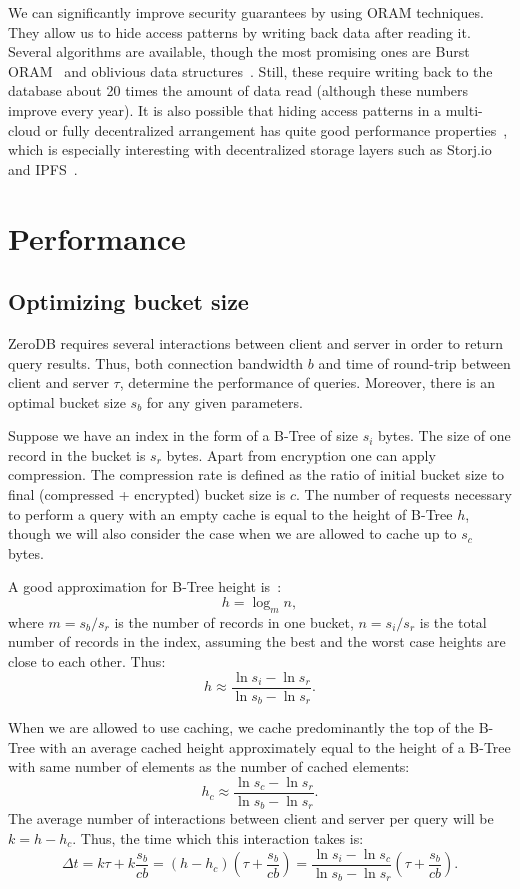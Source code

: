 \documentclass[notitlepage,longbibliography]{revtex4-1}
\begin{document}
We can significantly improve security guarantees by using ORAM techniques.
They allow us to hide access patterns by writing back data after reading it.
Several algorithms are available, though the most promising ones are Burst ORAM~\cite{burst-oram}
and oblivious data structures~\cite{ods-wang-2014}.
Still, these require writing back to the database about 20 times the amount of data read
(although these numbers improve every year).
It is also possible that hiding access patterns in a multi-cloud or fully decentralized arrangement has quite good performance properties~\cite{oram-multicloud},
which is especially interesting with decentralized storage layers such as Storj.io~\cite{storj} and IPFS~\cite{ipfs}.

\section{Performance}

\subsection{Optimizing bucket size}


ZeroDB requires several interactions between client and server in order to return query results.
Thus, both connection bandwidth $b$ and time of round-trip between client and server $\tau$, determine the performance of queries.
Moreover, there is an optimal bucket size $s_b$ for any given parameters.

Suppose we have an index in the form of a B-Tree of size $s_i$ bytes.
The size of one record in the bucket is $s_r$ bytes.
Apart from encryption one can apply compression.
The compression rate is defined as the ratio of initial bucket size to final (compressed + encrypted) bucket size is $c$.
The number of requests necessary to perform a query with an empty cache is equal to the height of B-Tree $h$, though we will also consider the case when we are allowed to cache up to $s_c$ bytes.


A good approximation for B-Tree height is~\cite{wiki:b-tree}:
$$h = \log_m n,$$
where $m = s_b/s_r$ is the number of records in one bucket,
$n = s_i/s_r$ is the total number of records in the index,
assuming the best and the worst case heights are close to each other.
Thus:
$$h \approx \frac{\ln s_i - \ln s_r}{\ln s_b - \ln s_r}.$$

When we are allowed to use caching, we cache predominantly the top of the B-Tree with an average cached height approximately equal to the height of a B-Tree with same number of elements as the number of cached elements:
$$h_c \approx \frac{\ln s_c - \ln s_r}{\ln s_b - \ln s_r}.$$
The average number of interactions between client and server per query will be $k = h - h_c$.
Thus, the time which this interaction takes is:
$$\Delta t = k\tau + k\frac{s_b}{cb} =
\left(h - h_c \right) \left( \tau + \frac{s_b}{cb} \right) =
\frac{\ln s_i - \ln s_c}{\ln s_b - \ln s_r} \left( \tau + \frac{s_b}{cb} \right).$$
\end{document}
